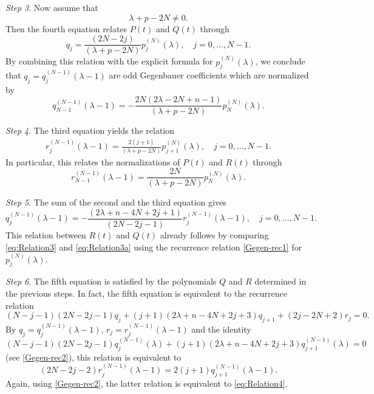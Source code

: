 \documentclass[a4paper,12pt,reqno]{amsart}
\numberwithin{theorem}{subsection}
\numberwithin{equation}{section}
\begin{document}
{\em Step 3}. Now assume that
$$
   \lambda\!+\!p\!-\!2N \ne 0.
$$
Then the fourth equation relates $P(t)$ and $Q(t)$ through
\begin{equation}\label{eq:Relation3}
   q_j = \frac{(2N\!-\!2j)}{(\lambda\!+\!p\!-\!2N)} p_j^{(N)}(\lambda), \quad j=0,\dots,N-1.
\end{equation}
By combining this relation with the explicit formula for $p_j^{(N)}(\lambda)$,
we conclude that $q_j=q_j^{(N-1)}(\lambda\!-\!1)$ are odd Gegenbauer
coefficients which are normalized by
$$
   q_{N-1}^{(N-1)}(\lambda\!-\!1)
   = -\frac{2N(2\lambda\!-\!2N\!+\!n\!-\!1)}{(\lambda\!+\!p\!-\!2N)} p_{N}^{(N)}(\lambda).
$$

{\em Step 4}. The third equation yields the relation
\begin{align}\label{eq:Relation3a}
   r_j^{(N-1)}(\lambda\!-\!1) = \frac{2(j\!+\!1)}{(\lambda\!+\!p\!-\!2N)}
   p_{j+1}^{(N)}(\lambda), \quad j=0,\dots,N-1.
\end{align}
In particular, this relates the normalizations of $P(t)$ and $R(t)$ through
\begin{equation*}
   r^{(N-1)}_{N-1}(\lambda\!-\!1) = \frac{2N}{(\lambda\!+\!p\!-\!2N)} p_N^{(N)}(\lambda).
\end{equation*}

{\em Step 5}. The sum of the second and the third equation gives
\begin{equation}\label{eq:Relation4}
   q_j^{(N-1)}(\lambda\!-\!1) = -\frac{(2\lambda\!+\!n\!-\!4N\!+\!2j\!+\!1)}{(2N\!-\!2j\!-\!1)}
   r^{(N-1)}_{j}(\lambda\!-\!1), \quad j=0,\dots, N-1.
\end{equation}
This relation between $R(t)$ and $Q(t)$ already follows by comparing
\eqref{eq:Relation3} and \eqref{eq:Relation3a} using the recurrence relation
\eqref{Gegen-rec1} for $p_j^{(N)}(\lambda)$.

{\em Step 6}. The fifth equation is satisfied by the polynomials $Q$ and $R$
determined in the previous steps. In fact, the fifth equation is equivalent to
the recurrence relation
$$
   (N\!-\!j\!-\!1)(2N\!-\!2j\!-\!1) q_j + (j\!+\!1)(2\lambda\!+\!n\!-\!4N\!+\!2j\!+\!3) q_{j+1}
   + (2j\!-\!2N\!+\!2) r_j = 0.
$$
By $q_j = q_j^{(N-1)}(\lambda\!-\!1)$, $r_j=r^{(N-1)}_j(\lambda\!-\!1)$ and the
identity
$$
   (N\!-\!j\!-\!1)(2N\!-\!2j\!-\!1) q_j^{(N-1)}(\lambda)
   + (j\!+\!1) (2\lambda\!+\!n\!-\!4N\!+\!2j\!+\!3) q_{j+1}^{(N-1)}(\lambda) = 0
$$
(see \eqref{Gegen-rec2}), this relation is equivalent to
$$
   (2N\!-\!2j\!-\!2) r_j^{(N-1)}(\lambda\!-\!1) = 2 (j\!+\!1) q_{j+1}^{(N-1)}(\lambda\!-\!1).
$$
Again, using \eqref{Gegen-rec2}, the latter relation is equivalent to
\eqref{eq:Relation4}.
\end{document}
